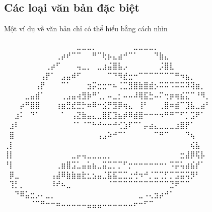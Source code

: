 \newpage
\subsection*{Các loại văn bản đặc biệt}\label{special-text}
Một ví dụ về văn bản chỉ có thể hiểu bằng cách nhìn

\begin{center}
    \begin{minipage}{0.4\textwidth}
        \fontsize{6pt}{9pt}\selectfont
        ⠀⠀⠀⠀⠀⠀⠀⠀⠀⠀⠀⠀⠀⠀⣀⣀⣀⡀⠀⠀⠀⠀⠀⠀⠀⣀⣀⣀⣀⡀\\
        ⠀⠀⠀⠀⠀⠀⠀⠀⠀⠀⢀⡴⠞⠉⠉⠀⠀⠛⠉⢗⡦⣄⣴⠚⠉⠁⠀⠀⠀⠙⣷⣄\\
        ⠀⠀⠀⠀⠀⠀⠀⠀⢀⡴⠋⠀⠀⠀⢤⣀⡀⠀⣀⣰⣬⣿⣧⡠⠀⠀⠀⠀⠀⠀⡨⣿⣇\\
        ⠀⠀⠀⠀⠀⠀⠀⢠⡟⠁⠀⣠⣤⠾⠋⠀⠀⠀⠀⠀⠉⠙⠻⣞⣒⠒⠉⠉⠉⠉⠉⠉⠉⠛⠲⣦⡀\\
        ⠀⠀⠀⠀⠀⠀⢠⡟⠀⠀⠀⠉⠁⠀⠀⠀⣲⡭⣒⣒⠒⠦⢈⣉⣻⣿⣷⣿⣾⡢⠭⠭⠩⠭⠭⠽⢽⣶⡀\\
        ⠀⠀⠀⠀⣀⣤⣾⠁⠀⠀⠀⢀⣠⣤⢴⣻⡷⠛⢁⡀⠤⣀⡂⠤⠤⠼⢿⣯⣓⠤⠍⢒⡶⢶⣮⣍⠉⠘⠻⡀\\
        ⠀⠀⠀⡴⠛⣿⣿⠀⠀⠀⢰⣶⣛⣞⣛⡓⠶⠿⠒⣪⡛⣻⡿⢶⣄⠀⢸⠃⠀⠀⢀⣿⠶⣾⠉⣹⣧⣀⣴⠃\\
        ⠀⠀⣰⠅⠀⠙⠁⠀⠀⠀⠀⠁⠀⢠⣝⣷⣤⣄⣀⣿⣏⣹⣦⡾⠿⣾⣿⠒⠒⠒⠲⠛⠛⠉⠋⡁⣩⠟⠁\\
        ⠀⣰⠇⠀⠀⠀⠀⠀⠀⠀⠀⠀⠀⠈⠁⠈⠉⠓⠚⠒⠒⠚⢊⣱⠏⠉⠁⡤⣴⣄⣀⣀⣀⣰⣿⡟⠁\\
        ⠀⣿⠀⠀⠀⠀⠀⠀⠀⠀⠀⠀⠀⠀⠀⠀⠀⠀⢠⣠⠵⠚⠉⠁⠀⠀⠀⠀⠀⠉⠛⠉⠀⠀⠀⠙⢦\\
        ⢀⡇⠀⠀⠀⠀⠀⠀⠀⠀⠀⠀⠀⠀⠀⠀⠀⠀⠀⠀⠀⠀⠀⠀⠀⠀⠀⠀⠀⠀⠀⠀⠀⠀⠀⠀⢮⣧\\
        ⢸⡇⠀⠀⠀⠀⠀⠀⠀⠀⠀⠀⠀⣀⡤⢤⣀⣀⣀⣀⡀⠀⠀⠀⠀⠀⠀⠀⠀⠀⠀⠀⠀⠀⣒⣼⡿⢯⡧\\
        ⠘⡇⠀⠀⠀⠀⠀⠀⠀⠀⢀⣶⣿⣩⣁⣤⣥⣦⣀⣭⣉⡉⡉⠋⡒⠒⠒⠒⠒⠒⠒⠂⠩⡭⢥⣴⣮⡞⠁\\
        ⠀⡿⣀⠀⠀⠀⠀⠀⠀⢠⣼⠿⣷⣷⣶⣗⣂⣢⣤⣈⣯⣯⣉⣉⣐⢚⠲⠚⡈⣉⢉⡋⡉⣩⣭⢭⡻⠃\\
        ⠀⢹⡃⡀⠀⠀⠀⠀⠀⠸⠞⠦⣀⠀⠀⠀⠀⠀⠀⠀⠈⠉⠉⠉⠉⠉⠉⠉⠉⠉⠉⠉⣙⠟⠉⠉\\
        ⠀⠀⠙⠿⣥⣒⡠⠄⣀⡀⠀⠀⠀⠀⠀⠀⠀⠀⠀⠀⠀⠀⠀⠀⠀⠀⣀⠠⢄⣲⡴⠚⠁\\
        ⠀⠀⠀⠀⠀⠈⠉⠛⠒⠒⠶⠤⠤⠤⠤⠤⣤⣤⣤⠤⠤⠤⠤⠤⠤⠖⠒⠋⠉%
    \end{minipage}
\end{center}

